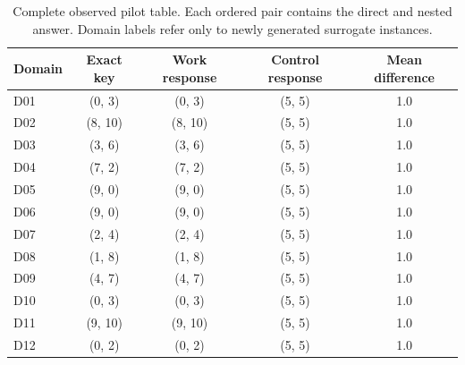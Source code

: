 \begin{table}[htbp]\centering\small
\begin{tabular}{lcccc}\toprule
Domain & Exact key & Work response & Control response & Mean difference\\\midrule
D01 & (0, 3) & (0, 3) & (5, 5) & 1.0 \\
D02 & (8, 10) & (8, 10) & (5, 5) & 1.0 \\
D03 & (3, 6) & (3, 6) & (5, 5) & 1.0 \\
D04 & (7, 2) & (7, 2) & (5, 5) & 1.0 \\
D05 & (9, 0) & (9, 0) & (5, 5) & 1.0 \\
D06 & (9, 0) & (9, 0) & (5, 5) & 1.0 \\
D07 & (2, 4) & (2, 4) & (5, 5) & 1.0 \\
D08 & (1, 8) & (1, 8) & (5, 5) & 1.0 \\
D09 & (4, 7) & (4, 7) & (5, 5) & 1.0 \\
D10 & (0, 3) & (0, 3) & (5, 5) & 1.0 \\
D11 & (9, 10) & (9, 10) & (5, 5) & 1.0 \\
D12 & (0, 2) & (0, 2) & (5, 5) & 1.0 \\
\bottomrule\end{tabular}
\caption{Complete observed pilot table. Each ordered pair contains the direct and nested answer. Domain labels refer only to newly generated surrogate instances.}
\end{table}
